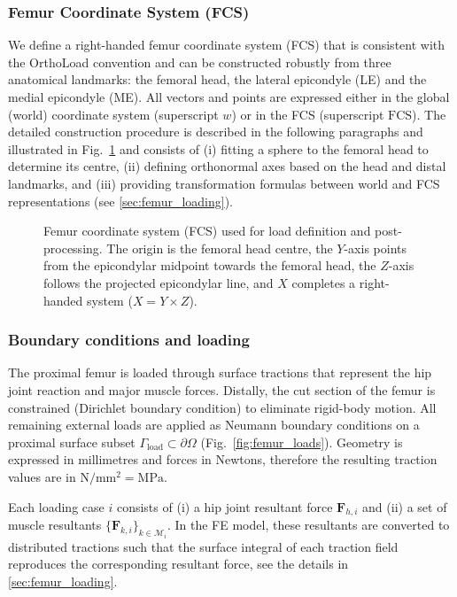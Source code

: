 \subsubsection*{Femur Coordinate System (FCS)}
We define a right-handed femur coordinate system (FCS) that is consistent with the OrthoLoad convention \cite{OrthoLoadDatabase} and can be constructed robustly from three anatomical landmarks: the femoral head, the lateral epicondyle (LE) and the medial epicondyle (ME). All vectors and points are expressed either in the global (world) coordinate system (superscript $w$) or in the FCS (superscript $\mathrm{FCS}$). The detailed construction procedure is described in the following paragraphs and illustrated in Fig.~\ref{fig:femur_css} and consists of (i) fitting a sphere to the femoral head to determine its centre, (ii) defining orthonormal axes based on the head and distal landmarks, and (iii) providing transformation formulas between world and FCS representations (see \ref{sec:femur_loading}).

\begin{figure}
    \centering
    \caption{Femur coordinate system (FCS) used for load definition and post-processing. The origin is the femoral head centre, the $Y$-axis points from the epicondylar midpoint towards the femoral head, the $Z$-axis follows the projected epicondylar line, and $X$ completes a right-handed system ($X=Y\times Z$).}
    \label{fig:femur_css}
\end{figure}

\subsubsection*{Boundary conditions and loading}
The proximal femur is loaded through surface tractions that represent the hip joint reaction and major muscle forces. Distally, the cut section of the femur is constrained (Dirichlet boundary condition) to eliminate rigid-body motion. All remaining external loads are applied as Neumann boundary conditions on a proximal surface subset $\Gamma_{\mathrm{load}}\subset\partial\Omega$ (Fig.~\ref{fig:femur_loads}). Geometry is expressed in millimetres and forces in Newtons, therefore the resulting traction values are in $\mathrm{N/mm^2}=\mathrm{MPa}$.

Each loading case $i$ consists of (i) a hip joint resultant force $\mathbf{F}_{h,i}$ and (ii) a set of muscle resultants $\{\mathbf{F}_{k,i}\}_{k\in\mathcal{M}_i}$. In the FE model, these resultants are converted to distributed tractions such that the surface integral of each traction field reproduces the corresponding resultant force, see the details in \ref{sec:femur_loading}.


